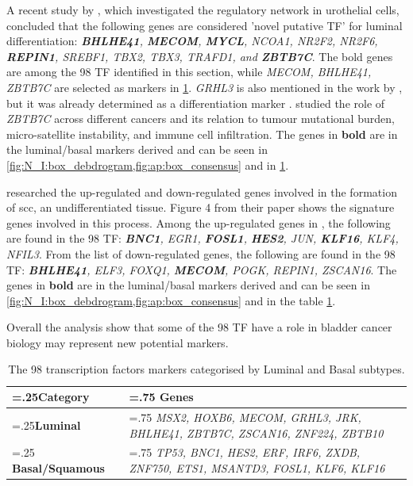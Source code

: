 A recent study by \citet{Ramal2024-ha}, which investigated the regulatory network in urothelial cells, concluded that the following genes are considered 'novel putative TF' for luminal differentiation: \textit{\textbf{BHLHE41}, \textbf{MECOM}, \textbf{MYCL}, NCOA1, NR2F2, NR2F6, \textbf{REPIN1}, SREBF1, TBX2, TBX3, TRAFD1, and \textbf{ZBTB7C}}. The bold genes are among the 98 TF identified in this section, while \textit{MECOM, BHLHE41, ZBTB7C} are selected as markers in \cref{tab:N_I:genes_lum_basal}. \textit{GRHL3} is also mentioned in the work by \citet{Ramal2024-ha}, but it was already determined as a differentiation marker \citep{Bock2014-zy}. \citet{Chen2021-tc} studied the role of \textit{ZBTB7C} across different cancers and its relation to tumour mutational burden, micro-satellite instability, and immune cell infiltration. The genes in \textbf{bold} are in the luminal/basal markers derived and can be seen in \cref{fig:N_I:box_debdrogram,fig:ap:box_consensus} and in \cref{tab:N_I:genes_lum_basal}.

\citet{Hurst2022-sp} researched the up-regulated and down-regulated genes involved in the formation of \acrfull{scc}, an undifferentiated tissue. Figure 4 from their paper shows the signature genes involved in this process. Among the up-regulated genes in \citet{Hurst2022-sp}, the following are found in the 98 TF: \textit{\textbf{BNC1}, EGR1, \textbf{FOSL1}, \textbf{HES2}, JUN, \textbf{KLF16}, KLF4, NFIL3}. From the list of down-regulated genes, the following are found in the 98 TF: \textit{\textbf{BHLHE41}, ELF3, FOXQ1, \textbf{MECOM}, POGK, REPIN1, ZSCAN16}. The genes in \textbf{bold} are in the luminal/basal markers derived and can be seen in \cref{fig:N_I:box_debdrogram,fig:ap:box_consensus} and in the table \cref{tab:N_I:genes_lum_basal}.

% 
Overall the analysis show that some of the 98 TF have a role in bladder cancer biology may represent new potential markers.

\begin{table}[!htb]
  \centering
  \small
  \begin{tabularx}{\textwidth}{>{\hsize=.25\hsize}X|>{\hsize=.75\hsize}X}
    \toprule
    \textbf{Category} & \textbf{Genes} \\
    \midrule
    \textbf{Luminal} & \textit{MSX2, HOXB6, MECOM, GRHL3, JRK, BHLHE41, ZBTB7C, ZSCAN16, ZNF224, ZBTB10} \\
    \midrule
    \textbf{Basal/Squamous} & \textit{TP53, BNC1, HES2, ERF, IRF6, ZXDB, ZNF750, ETS1, MSANTD3, FOSL1, KLF6, KLF16} \\
    \bottomrule
  \end{tabularx}
  \caption[Luminal and Basal markers from the 98 TF]{The 98 transcription factors markers categorised by Luminal and Basal subtypes.} %
  \label{tab:N_I:genes_lum_basal}
\end{table}


